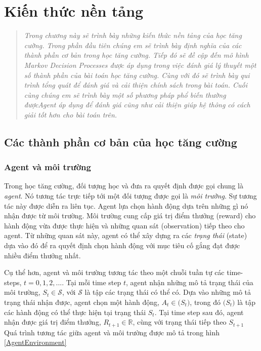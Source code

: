 \chapter{Kiến thức nền tảng}
\ifpdf
\graphicspath{{Chapter2/Chapter2Figs/PNG/}{Chapter2/Chapter2Figs/PDF/}{Chapter2/Chapter2Figs/}}
\else
\graphicspath{{Chapter2/Chapter2Figs/EPS/}{Chapter2/Chapter2Figs/}}
\fi
\begin{quote}
\textit{Trong chương này sẽ trình bày những kiến thức nền tảng của học tăng cường. Trong phần đầu tiên chúng em sẽ trình bày định nghĩa của các thành phần cơ bản trong học tăng cường. Tiếp đó sẽ đề cập đến mô hình Markov Decision Processes được áp dụng trong việc đánh giá lý thuyết một số thành phần của bài toán học tăng cường. Cùng với đó sẽ trình bày qui trình tổng quát để đánh giá và cải thiện chính sách trong bài toán. Cuối cùng chúng em sẽ trình bày một số phương pháp phổ biến thường đượcAgent áp dụng để đánh giá cũng như cải thiện giúp hệ thông có cách giải tốt hơn cho bài toán trên.}
\end{quote}

\section{Các thành phần cơ bản của học tăng cường}
	\subsection{Agent và môi trường}
	Trong học tăng cường, đối tượng học và đưa ra quyết định được gọi chung là \textit{agent}. Nó tương tác trực tiếp tới một đối tượng được gọi là \textit{môi trường}. Sự tương tác này được diễn ra liên tục. Agent lựa chọn hành động dựa trên những gì nó nhận được từ môi trường. Môi trường cung cấp giá trị điểm thưởng (reward) cho hành động vừa được thực hiện và những quan sát (observation) tiếp theo cho agent. Từ những quan sát này, agent có thể xây dựng ra các \textit{trạng thái} (state) dựa vào đó để ra quyết định chọn hành động với mục tiêu cố gắng đạt được nhiều điểm thưởng nhất.
	
	Cụ thể hơn, agent và môi trường tương tác theo một chuỗi tuần tự các time-steps, $t = 0,1,2,...$. Tại mỗi time step $t$, agent nhận những mô tả trạng thái của môi trường, $\mathit{S_t} \in \mathcal{S}$, với $\mathcal{S}$ là tập các trạng thái có thể có. Dựa vào những mô tả trạng thái nhận được, agent chọn một hành động, $\mathit{A_t} \in \mathcal(\mathit{S_t})$, trong đó $\mathcal(\mathit{S_t})$ là tập các hành động có thể thực hiện tại trạng thái $\mathit{S_t}$. Tại time step sau đó, agent nhận được giá trị điểm thưởng, $\mathit{R_{t+1}} \in \mathbb{R}$, cùng với trạng thái tiếp theo $\mathit{S_{t+1}}$ Quá trình tương tác giữa agent và môi trường được mô tả trong hình \ref{AgentEnvironment}
		
